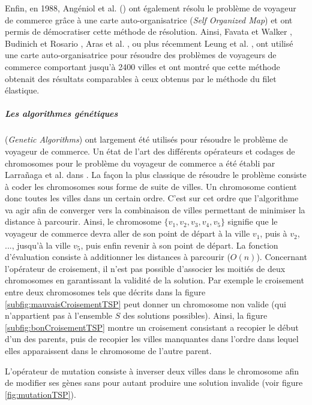 Enfin, en 1988, Angéniol et al. (\cite{Angeniol1988}) ont également résolu le problème de voyageur de commerce grâce à une carte auto-organisatrice (\textit{Self Organized Map}) et ont permis de démocratiser cette méthode de résolution. Ainsi, Favata et Walker \cite{Favala1991}, Budinich et Rosario \cite{Budinich1996}, Aras et al. \cite{Aras1999}, ou plus récemment Leung et al. \cite{Leung2004}, ont utilisé une carte auto-organisatrice pour résoudre des problèmes de voyageurs de commerce comportant jusqu'à 2400 villes et ont montré que cette méthode obtenait des résultats comparables à ceux obtenus par le méthode du filet élastique.

\subparagraph{Les algorithmes génétiques} (\textit{Genetic Algorithms}) ont largement été utilisés pour résoudre le problème de voyageur de commerce. Un état de l'art des différents opérateurs et codages de chromosomes pour le problème du voyageur de commerce a été établi par Larra\~naga et al. dans \cite{Larranaga1999}. La façon la plus classique de résoudre le problème consiste à coder les chromosomes sous forme de suite de villes. Un chromosome contient donc toutes les villes dans un certain ordre. C'est sur cet ordre que l'algorithme va agir afin de converger vers la combinaison de villes permettant de minimiser la distance à parcourir. Ainsi, le chromosome $\{v_1, v_2, v_3, v_4, v_5\}$ signifie que le voyageur de commerce devra aller de son point de départ à la ville $v_1$, puis à $v_2$, ..., jusqu'à la ville $v_5$, puis enfin revenir à son point de départ.
La fonction d'évaluation consiste à additionner les distances à parcourir ($O(n)$).
Concernant l'opérateur de croisement, il n'est pas possible d'associer les moitiés de deux chromosomes en garantissant la validité de la solution. Par exemple le croisement entre deux chromosomes tels que décrits dans la figure \ref{subfig:mauvaisCroisementTSP} peut donner un chromosome non valide (qui n'appartient pas à l'ensemble $S$ des solutions possibles). Ainsi, la figure \ref{subfig:bonCroisementTSP} montre un croisement consistant a recopier le début d'un des parents, puis de recopier les villes manquantes dans l'ordre dans lequel elles apparaissent dans le chromosome de l'autre parent.

L'opérateur de mutation consiste à inverser deux villes dans le chromosome afin de modifier ses gènes sans pour autant produire une solution invalide (voir figure \ref{fig:mutationTSP}).

